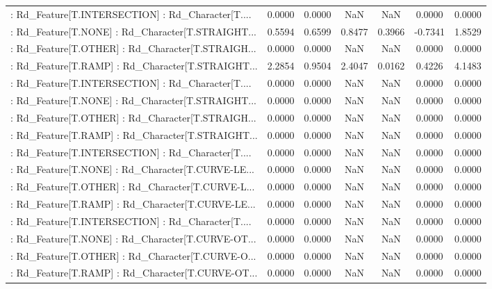 \begin{longtable}{p{4cm}cccccc}
 : Rd\_Feature[T.INTERSECTION] : Rd\_Character[T.... &  0.0000 &    0.0000 &     NaN &          NaN &  0.0000 &  0.0000 \\
 : Rd\_Feature[T.NONE] : Rd\_Character[T.STRAIGHT... &  0.5594 &    0.6599 &  0.8477 &       0.3966 & -0.7341 &  1.8529 \\
 : Rd\_Feature[T.OTHER] : Rd\_Character[T.STRAIGH... &  0.0000 &    0.0000 &     NaN &          NaN &  0.0000 &  0.0000 \\
 : Rd\_Feature[T.RAMP] : Rd\_Character[T.STRAIGHT... &  2.2854 &    0.9504 &  2.4047 &       0.0162 &  0.4226 &  4.1483 \\
 : Rd\_Feature[T.INTERSECTION] : Rd\_Character[T.... &  0.0000 &    0.0000 &     NaN &          NaN &  0.0000 &  0.0000 \\
 : Rd\_Feature[T.NONE] : Rd\_Character[T.STRAIGHT... &  0.0000 &    0.0000 &     NaN &          NaN &  0.0000 &  0.0000 \\
 : Rd\_Feature[T.OTHER] : Rd\_Character[T.STRAIGH... &  0.0000 &    0.0000 &     NaN &          NaN &  0.0000 &  0.0000 \\
 : Rd\_Feature[T.RAMP] : Rd\_Character[T.STRAIGHT... &  0.0000 &    0.0000 &     NaN &          NaN &  0.0000 &  0.0000 \\
 : Rd\_Feature[T.INTERSECTION] : Rd\_Character[T.... &  0.0000 &    0.0000 &     NaN &          NaN &  0.0000 &  0.0000 \\
 : Rd\_Feature[T.NONE] : Rd\_Character[T.CURVE-LE... &  0.0000 &    0.0000 &     NaN &          NaN &  0.0000 &  0.0000 \\
 : Rd\_Feature[T.OTHER] : Rd\_Character[T.CURVE-L... &  0.0000 &    0.0000 &     NaN &          NaN &  0.0000 &  0.0000 \\
 : Rd\_Feature[T.RAMP] : Rd\_Character[T.CURVE-LE... &  0.0000 &    0.0000 &     NaN &          NaN &  0.0000 &  0.0000 \\
 : Rd\_Feature[T.INTERSECTION] : Rd\_Character[T.... &  0.0000 &    0.0000 &     NaN &          NaN &  0.0000 &  0.0000 \\
 : Rd\_Feature[T.NONE] : Rd\_Character[T.CURVE-OT... &  0.0000 &    0.0000 &     NaN &          NaN &  0.0000 &  0.0000 \\
 : Rd\_Feature[T.OTHER] : Rd\_Character[T.CURVE-O... &  0.0000 &    0.0000 &     NaN &          NaN &  0.0000 &  0.0000 \\
 : Rd\_Feature[T.RAMP] : Rd\_Character[T.CURVE-OT... &  0.0000 &    0.0000 &     NaN &          NaN &  0.0000 &  0.0000 \\

\end{longtable}
